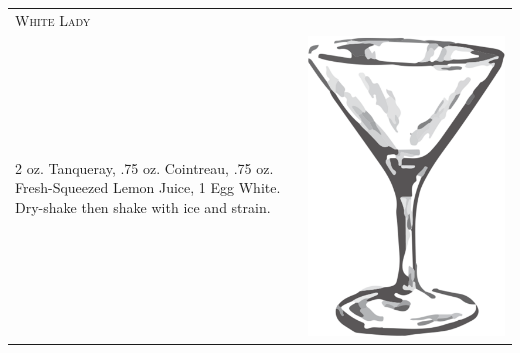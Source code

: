 \documentclass{article}
\begin{document}
\begin{tabular}{p{2in} p{0.5in}}
\multicolumn{2}{p{3in}}{\centering\Huge\textsc{White Lady}} \\ 
   \vspace{-0.1in}2 oz. Tanqueray, .75 oz. Cointreau, .75 oz. Fresh-Squeezed Lemon Juice, 1 Egg White. Dry-shake then shake with ice and strain.&
   \vspace{-0.1in} \includegraphics{goblet.png}
\end{tabular}
\end{document}
